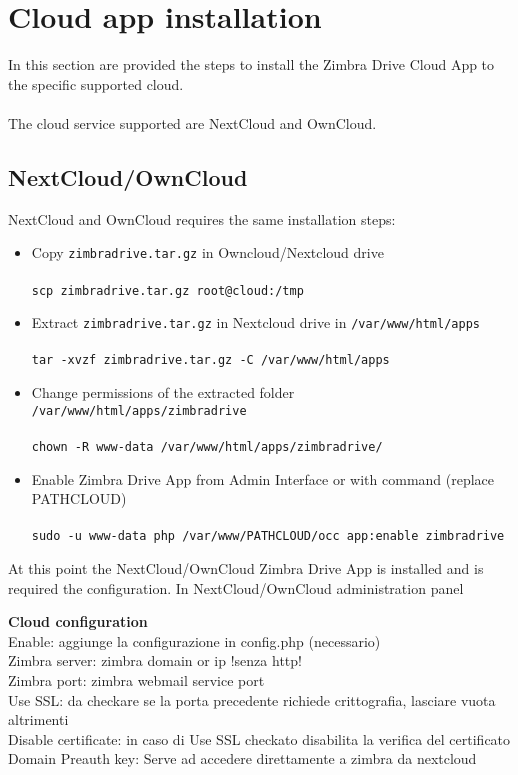 \section{Cloud app installation}

In this section are provided the steps to install the Zimbra Drive Cloud App to the specific supported cloud.\\
\\
The cloud service supported are NextCloud and OwnCloud.

    \subsection{NextCloud/OwnCloud}
        NextCloud and OwnCloud requires the same installation steps:
        
        \begin{itemize}
            \item Copy \texttt{zimbradrive.tar.gz} in Owncloud/Nextcloud drive\\ \\
            \texttt{scp zimbradrive.tar.gz root@cloud:/tmp}\\
            \item Extract \texttt{zimbradrive.tar.gz} in Nextcloud drive in \texttt{/var/www/html/apps}\\ \\
            \texttt{tar -xvzf zimbradrive.tar.gz -C /var/www/html/apps}\\
            \item Change permissions of the extracted folder \texttt{/var/www/html/apps/zimbradrive}\\ \\
            \texttt{chown -R www-data /var/www/html/apps/zimbradrive/}\\
            \item Enable Zimbra Drive App from Admin Interface or with command (replace PATH\textunderscore CLOUD)\\ \\
            \texttt{sudo -u www-data php /var/www/PATH\textunderscore CLOUD/occ app:enable zimbradrive}
        \end{itemize}

        At this point the NextCloud/OwnCloud Zimbra Drive App is installed and is required the configuration.
        In NextCloud/OwnCloud administration panel

            \textbf{Cloud configuration}\\
            Enable: aggiunge la configurazione in config.php (necessario)\\
            Zimbra server: zimbra domain or ip !senza http!\\
            Zimbra port: zimbra webmail service port\\
            Use SSL: da checkare se la porta precedente richiede crittografia, lasciare vuota altrimenti\\
            Disable certificate: in caso di Use SSL checkato disabilita la verifica del certificato\\
            Domain Preauth key: Serve ad accedere direttamente a zimbra da nextcloud

